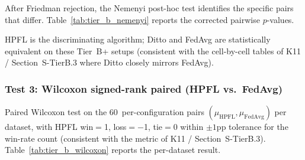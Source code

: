 \documentclass[conference]{IEEEtran}
\begin{document}
After Friedman rejection, the Nemenyi post-hoc test identifies the specific pairs that differ. Table~\ref{tab:tier_b_nemenyi} reports the corrected pairwise $p$-values.

\begin{table}[htbp]
\centering
\caption{Nemenyi post-hoc pairwise comparison after Friedman rejection. HPFL is significantly different from FedAvg and Ditto on all three datasets; FedAvg and Ditto are not significantly different (substantively equivalent on these tabular setups).}
\label{tab:tier_b_nemenyi}
\small
{}

\vspace{1mm}
\footnotesize{HPFL is the discriminating algorithm; Ditto and FedAvg are statistically equivalent on these Tier~B+ setups (consistent with the cell-by-cell tables of K11 / Section~S-TierB.3 where Ditto closely mirrors FedAvg).}
\end{table}

\subsubsection*{Test 3: Wilcoxon signed-rank paired (HPFL vs.\ FedAvg)}

Paired Wilcoxon test on the 60~per-configuration pairs $(\mu_{\text{HPFL}}, \mu_{\text{FedAvg}})$ per dataset, with HPFL win$=$1, loss$=$$-$1, tie$=$0 within $\pm 1$pp tolerance for the win-rate count (consistent with the metric of K11 / Section~S-TierB.3). Table~\ref{tab:tier_b_wilcoxon} reports the per-dataset result.
\end{document}
